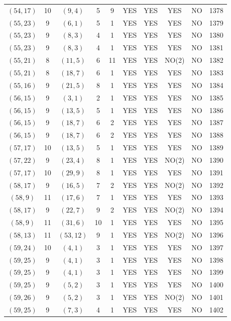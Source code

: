 \begin{longtable}{|c|c|c|c|c|c|c|c|c|c|}
$(54, 17)$ & 10 & $(9, 4)$ & 5 & 9 & YES & YES & YES & NO & 1378\\
$(55, 23)$ & 9 & $(6, 1)$ & 5 & 1 & YES & YES & YES & NO & 1379\\
$(55, 23)$ & 9 & $(8, 3)$ & 4 & 1 & YES & YES & YES & NO & 1380\\
$(55, 23)$ & 9 & $(8, 3)$ & 4 & 1 & YES & YES & YES & NO & 1381\\
$(55, 21)$ & 8 & $(11, 5)$ & 6 & 11 & YES & YES & NO(2) & NO & 1382\\
$(55, 21)$ & 8 & $(18, 7)$ & 6 & 1 & YES & YES & YES & NO & 1383\\
$(55, 16)$ & 9 & $(21, 5)$ & 8 & 1 & YES & YES & YES & NO & 1384\\
$(56, 15)$ & 9 & $(3, 1)$ & 2 & 1 & YES & YES & YES & NO & 1385\\
$(56, 15)$ & 9 & $(13, 5)$ & 5 & 1 & YES & YES & YES & NO & 1386\\
$(56, 15)$ & 9 & $(18, 7)$ & 6 & 2 & YES & YES & YES & NO & 1387\\
$(56, 15)$ & 9 & $(18, 7)$ & 6 & 2 & YES & YES & YES & NO & 1388\\
$(57, 17)$ & 10 & $(13, 5)$ & 5 & 1 & YES & YES & YES & NO & 1389\\
$(57, 22)$ & 9 & $(23, 4)$ & 8 & 1 & YES & YES & NO(2) & NO & 1390\\
$(57, 17)$ & 10 & $(29, 9)$ & 8 & 1 & YES & YES & YES & NO & 1391\\
$(58, 17)$ & 9 & $(16, 5)$ & 7 & 2 & YES & YES & NO(2) & NO & 1392\\
$(58, 9)$ & 11 & $(17, 6)$ & 7 & 1 & YES & YES & YES & NO & 1393\\
$(58, 17)$ & 9 & $(22, 7)$ & 9 & 2 & YES & YES & NO(2) & NO & 1394\\
$(58, 9)$ & 11 & $(31, 6)$ & 10 & 1 & YES & YES & YES & NO & 1395\\
$(58, 13)$ & 11 & $(53, 12)$ & 9 & 1 & YES & YES & NO(2) & NO & 1396\\
$(59, 24)$ & 10 & $(4, 1)$ & 3 & 1 & YES & YES & YES & NO & 1397\\
$(59, 25)$ & 9 & $(4, 1)$ & 3 & 1 & YES & YES & YES & NO & 1398\\
$(59, 25)$ & 9 & $(4, 1)$ & 3 & 1 & YES & YES & YES & NO & 1399\\
$(59, 25)$ & 9 & $(5, 2)$ & 3 & 1 & YES & YES & YES & NO & 1400\\
$(59, 26)$ & 9 & $(5, 2)$ & 3 & 1 & YES & YES & NO(2) & NO & 1401\\
$(59, 25)$ & 9 & $(7, 3)$ & 4 & 1 & YES & YES & YES & NO & 1402\\

\end{longtable}
